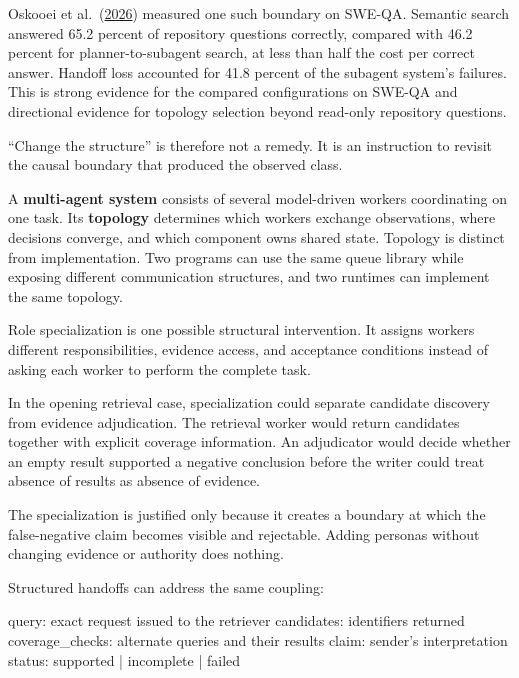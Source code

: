 Oskooei et al.~(\href{https://arxiv.org/abs/2608.01507}{2026}) measured one such boundary on SWE-QA. Semantic search answered 65.2 percent of repository questions correctly, compared with 46.2 percent for planner-to-subagent search, at less than half the cost per correct answer. Handoff loss accounted for 41.8 percent of the subagent system's failures. This is strong evidence for the compared configurations on SWE-QA and directional evidence for topology selection beyond read-only repository questions.

``Change the structure'' is therefore not a remedy. It is an instruction to revisit the causal boundary that produced the observed class.

A \textbf{multi-agent system} consists of several model-driven workers coordinating on one task. Its \textbf{topology} determines which workers exchange observations, where decisions converge, and which component owns shared state. Topology is distinct from implementation. Two programs can use the same queue library while exposing different communication structures, and two runtimes can implement the same topology.

Role specialization is one possible structural intervention. It assigns workers different responsibilities, evidence access, and acceptance conditions instead of asking each worker to perform the complete task.

In the opening retrieval case, specialization could separate candidate discovery from evidence adjudication. The retrieval worker would return candidates together with explicit coverage information. An adjudicator would decide whether an empty result supported a negative conclusion before the writer could treat absence of results as absence of evidence.

The specialization is justified only because it creates a boundary at which the false-negative claim becomes visible and rejectable. Adding personas without changing evidence or authority does nothing.

Structured handoffs can address the same coupling:

\begin{record}
\begin{recordbody}
query: exact request issued to the retriever
candidates: identifiers returned
coverage_checks: alternate queries and their results
claim: sender's interpretation
status: supported | incomplete | failed
\end{recordbody}
\end{record}

